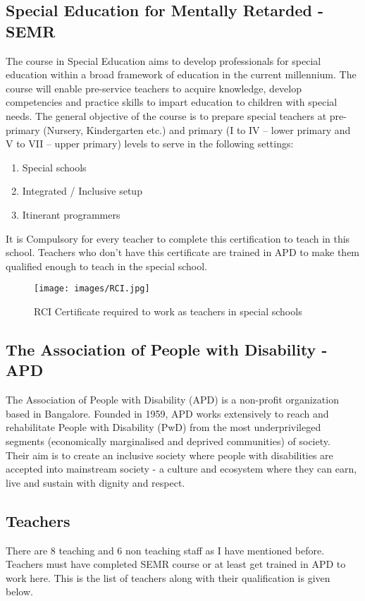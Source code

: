 \subsection{Special Education for Mentally Retarded - SEMR}
The course in Special Education aims to develop professionals for special education within a broad framework of education in the current millennium. The course will enable pre-service teachers to acquire knowledge, develop competencies and practice skills to impart education to children with special needs. The general objective of the course is to prepare special teachers at pre-primary (Nursery, Kindergarten etc.) and primary (I to IV – lower primary and V to VII – upper primary) levels to serve in the following settings:
\begin{enumerate}
    \item Special schools
    \item Integrated / Inclusive setup
    \item Itinerant programmers
\end{enumerate}
It is Compulsory for every teacher to complete this certification to teach in this school. Teachers who don't have this certificate are trained in APD to make them qualified enough to teach in the special school.
\begin{figure}[H]
    \centering
    \texttt{[image: images/RCI.jpg]}
    \caption{RCI Certificate required to work as teachers in special schools}
\end{figure}
\subsection{The Association of People with Disability - APD}
The Association of People with Disability (APD) is a non-profit organization based in Bangalore. Founded in 1959, APD works extensively to reach and rehabilitate People with Disability (PwD) from the most underprivileged segments (economically marginalised and deprived communities) of society. \\
Their aim is to create an inclusive society where people with disabilities are accepted into mainstream society - a culture and ecosystem where they can earn, live and sustain with dignity and respect.
\subsection{Teachers}
There are 8 teaching and 6 non teaching staff as I have mentioned before. Teachers must have completed SEMR course or at least get trained in APD to work here. This is the list of teachers along with their qualification is given below.

